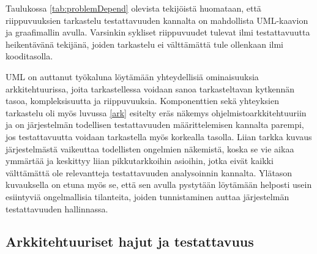 \documentclass[finnish]{tktltiki2}
\numberwithin{table}{section}
\theoremstyle{definition}
\theoremstyle{remark}
\begin{document}
\noindent
Taulukossa \ref{tab:problemDepend} olevista tekijöistä huomataan, että riippuvuuksien tarkastelu testattavuuden kannalta on mahdollista UML-kaavion ja graafimallin avulla. Varsinkin sykliset riippuvuudet tulevat ilmi testattavuutta heikentävänä tekijänä, joiden tarkastelu ei välttämättä tule ollenkaan ilmi kooditasolla.  

UML on auttanut työkaluna löytämään yhteydellisiä ominaisuuksia arkkitehtuurissa, joita tarkastellessa voidaan sanoa tarkasteltavan  kytkennän tasoa, kompleksisuutta ja riippuvuuksia. Komponenttien sekä yhteyksien tarkastelu oli myös luvussa \ref{ark} esitelty eräs näkemys ohjelmistoarkkitehtuuriin ja on järjestelmän todellisen testattavuuden määrittelemisen kannalta parempi, jos testattavuutta voidaan tarkastella myös korkealla tasolla. Liian tarkka kuvaus järjestelmästä vaikeuttaa todellisten ongelmien näkemistä, koska se vie aikaa ymmärtää ja keskittyy liian pikkutarkkoihin asioihin, jotka eivät kaikki välttämättä ole relevantteja testattavuuden analysoinnin kannalta. Ylätason kuvauksella on etuna myös se, että sen avulla pystytään löytämään helposti usein esiintyviä ongelmallisia tilanteita, joiden tunnistaminen auttaa järjestelmän testattavuuden hallinnassa.

 

\subsection{Arkkitehtuuriset hajut ja testattavuus} \label{arch_smells_and_testability}
\end{document}
